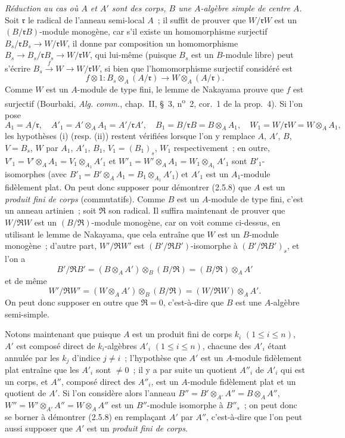 \begin{env}[2.5.8.8]
\label{IV.2.5.8.8-fr}
\emph{Réduction au cas où $A$ et $A'$ sont des corps, $B$ une $A$-algèbre
simple de centre $A$.} Soit $\mathfrak r$ le radical de l'anneau semi-local
$A$~; il suffit de prouver que $W/\mathfrak rW$ est un
$(B/\mathfrak rB)$-module monogène, car s'il existe un homomorphisme surjectif
$B_s/\mathfrak rB_s\to W/\mathfrak rW$, il donne par composition un
homomorphisme $B_s\to B_s/\mathfrak rB_s\to W/\mathfrak rW$, qui lui-même
(puisque $B_s$ est un $B$-module libre) peut s'écrire
$B_s\xrightarrow{f}W\to W/\mathfrak rW$, si bien que l'homomorphisme
surjectif considéré est
\[
f\otimes1:B_s\otimes_A(A/\mathfrak r)\longrightarrow
W\otimes_A(A/\mathfrak r).
\]
Comme $W$ est un $A$-module de type fini, le lemme de Nakayama prouve que
$f$ est surjectif (Bourbaki, \emph{Alg. comm.}, chap.~II, \S~3,
n\textsuperscript{o}~2, cor.~1 de la prop.~4). Si l'on pose
\[
A_1=A/\mathfrak r,\quad A'_1=A'\otimes_A A_1=A'/\mathfrak rA',\quad
B_1=B/\mathfrak rB=B\otimes_A A_1,\quad
W_1=W/\mathfrak rW=W\otimes_A A_1,
\]
les hypothèses (i) (resp. (ii)) restent vérifiées lorsque l'on y remplace
$A$, $A'$, $B$, $V=B_s$, $W$ par $A_1$, $A'_1$, $B_1$,
$V_1=(B_1)_s$, $W_1$ respectivement~; en outre,
$V'_1=V'\otimes_A A_1=V_1\otimes_{A_1}A'_1$ et
$W'_1=W'\otimes_A A_1=W_1\otimes_{A_1}A'_1$ sont $B'_1$-isomorphes (avec
$B'_1=B'\otimes_A A_1=B_1\otimes_{A_1}A'_1$) et $A'_1$ est un $A_1$-module
fidèlement plat. On peut donc supposer pour démontrer (2.5.8) que $A$ est un
\emph{produit fini de corps} (commutatifs). Comme $B$ est un $A$-module de
type fini, c'est un anneau artinien~; soit $\mathfrak R$ son radical. Il
suffira maintenant de prouver que $W/\mathfrak RW$ est un
$(B/\mathfrak R)$-module monogène, car on voit comme ci-dessus, en utilisant
le lemme de Nakayama, que cela entraîne que $W$ est un $B$-module monogène~;
d'autre part, $W'/\mathfrak RW'$ est $(B'/\mathfrak RB')$-isomorphe à
$(B'/\mathfrak RB')_s$, et l'on a
\[
B'/\mathfrak RB'=(B\otimes_A A')\otimes_B(B/\mathfrak R)
=(B/\mathfrak R)\otimes_A A'
\]
et de même
\[
W'/\mathfrak RW'=(W\otimes_A A')\otimes_B(B/\mathfrak R)
=(W/\mathfrak RW)\otimes_A A'.
\]
On peut donc supposer en outre que $\mathfrak R=0$, c'est-à-dire que $B$ est
une $A$-algèbre semi-simple.

Notons maintenant que puisque $A$ est un produit fini de corps $k_i$
$(1\leq i\leq n)$, $A'$ est composé direct de $k_i$-algèbres $A'_i$
$(1\leq i\leq n)$, chacune des $A'_i$ étant annulée par les $k_j$ d'indice
$j\ne i$~; l'hypothèse que $A'$ est un $A$-module fidèlement plat entraîne
que les $A'_i$ sont $\ne0$~; il y a par suite un quotient $A''_i$ de $A'_i$
qui est un corps, et $A''$, composé direct des $A''_i$, est un $A$-module
fidèlement plat et un quotient de $A'$. Si l'on considère alors l'anneau
$B''=B'\otimes_{A'}A''=B\otimes_A A''$,
$W''=W'\otimes_{A'}A''=W\otimes_A A''$ est un $B''$-module isomorphe à
$B''_s$~; on peut donc se borner à démontrer (2.5.8) en remplaçant $A'$ par
$A''$, c'est-à-dire que l'on peut aussi supposer que $A'$ est un \emph{produit
fini de corps}.


\end{env}
